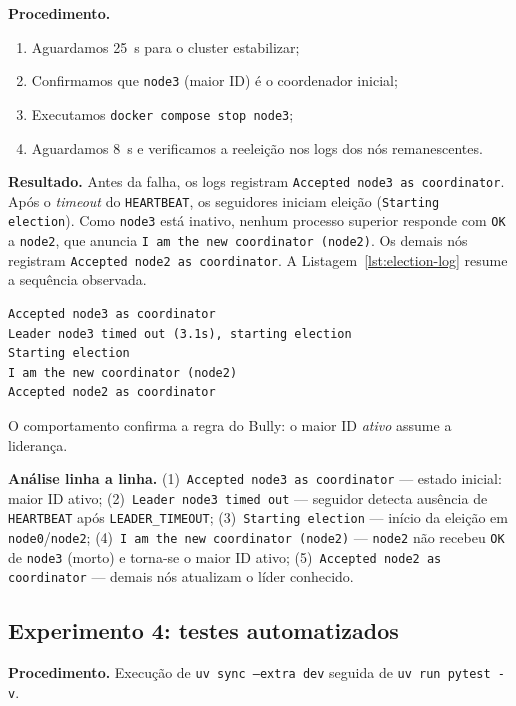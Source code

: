 \documentclass[10pt, a4paper, titlepage]{extarticle}
\begin{document}
\textbf{Procedimento.}
\begin{enumerate}[nosep]
  \item Aguardamos 25~s para o cluster estabilizar;
  \item Confirmamos que \texttt{node3} (maior ID) é o coordenador inicial;
  \item Executamos \texttt{docker compose stop node3};
  \item Aguardamos 8~s e verificamos a reeleição nos logs dos nós remanescentes.
\end{enumerate}

\textbf{Resultado.} Antes da falha, os logs registram \texttt{Accepted node3 as coordinator}. Após o \emph{timeout} do \texttt{HEARTBEAT}, os seguidores iniciam eleição (\texttt{Starting election}). Como \texttt{node3} está inativo, nenhum processo superior responde com \texttt{OK} a \texttt{node2}, que anuncia \texttt{I am the new coordinator (node2)}. Os demais nós registram \texttt{Accepted node2 as coordinator}. A Listagem~\ref{lst:election-log} resume a sequência observada.

\begin{lstlisting}[caption={Trecho de log da reeleição após parada de \texttt{node3}.},label=lst:election-log]
Accepted node3 as coordinator
Leader node3 timed out (3.1s), starting election
Starting election
I am the new coordinator (node2)
Accepted node2 as coordinator
\end{lstlisting}

O comportamento confirma a regra do Bully: o maior ID \emph{ativo} assume a liderança.

\textbf{Análise linha a linha.} (1)~\texttt{Accepted node3 as coordinator} --- estado inicial: maior ID ativo; (2)~\texttt{Leader node3 timed out} --- seguidor detecta ausência de \texttt{HEARTBEAT} após \texttt{LEADER\_TIMEOUT}; (3)~\texttt{Starting election} --- início da eleição em \texttt{node0}/\texttt{node2}; (4)~\texttt{I am the new coordinator (node2)} --- \texttt{node2} não recebeu \texttt{OK} de \texttt{node3} (morto) e torna-se o maior ID ativo; (5)~\texttt{Accepted node2 as coordinator} --- demais nós atualizam o líder conhecido.

\subsection{Experimento 4: testes automatizados}
\textbf{Procedimento.} Execução de \texttt{uv sync --extra dev} seguida de \texttt{uv run pytest -v}.
\end{document}
